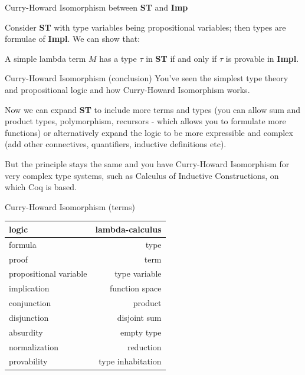 \documentclass[10pt]{beamer}
\begin{document}
\begin{frame}{Curry-Howard Isomorphism between {\bf ST} and {\bf Imp}}

  Consider {\bf ST} with type variables being propositional variables; then types are formulae of {\bf Impl}. We can show that:
\vspace{1cm}
   
\begin{theorem}[CHI]
  A simple lambda term $M$ has a type $\tau$ in {\bf ST} if and only if $\tau$ is provable in {\bf Impl}.
  \end{theorem}

\end{frame}

\begin{frame}{Curry-Howard Isomorphism (conclusion)}
             You've seen the simplest type theory and propositional logic and how Curry-Howard Isomorphism works.
    
             Now we can expand {\bf ST} to include more terms and types (you can allow sum and product types, polymorphism, recursors - which allows you to formulate more functions) or alternatively expand the logic to be more expressible and complex (add other
             connectives, quantifiers, inductive definitions etc).
    
             But the principle stays the same and you have Curry-Howard Isomorphism for very complex type systems, such as Calculus of Inductive Constructions, on which Coq is based. 
\end{frame}

\begin{frame}{Curry-Howard Isomorphism (terms)}
       
       \begin{tabular}{ l | r }
         {\bf logic } & {\bf lambda-calculus} \\
         \hline
         formula & type  \\
         proof & term \\
         propositional variable & type variable  \\
         implication & function space  \\
         conjunction & product \\
         disjunction & disjoint sum \\
         absurdity & empty type \\
         normalization & reduction \\
         provability & type inhabitation \\      
       \end{tabular}
\end{frame}
       
\end{document}
